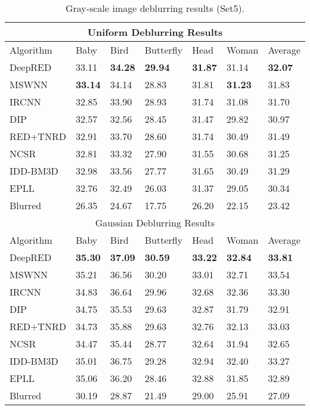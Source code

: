 \documentclass[12pt]{article}
\begin{document}
\begin{table}[!t]
 \centering
 \footnotesize\addtolength{\tabcolsep}{-5pt}
\begin{tabularx}{\linewidth}{|l||X X X X X||X|}
 \hline
 \multicolumn{7}{|c|}{Uniform Deblurring Results} \\
 \hline
 Algorithm & \textsf{Baby} & \textsf{Bird} & \textsf{Butterfly} & \textsf{Head} & \textsf{Woman} & Average \\ \hline
DeepRED & 33.11 & \textbf{34.28} & \textbf{29.94} & \textbf{31.87} & 31.14 & \textbf{32.07} \\
MSWNN & \textbf{33.14} & 34.14 & 28.83 & 31.81 &  \textbf{31.23} & 31.83 \\
IRCNN & 32.85 & 33.90 & 28.93 & 31.74 & 31.08 & 31.70 \\
DIP & 32.57 & 32.56 & 28.45 & 31.47 & 29.82 & 30.97 \\
RED+TNRD & 32.91 & 33.70 & 28.60 & 31.74 & 30.49 & 31.49 \\
NCSR & 32.81 & 33.32 & 27.90 & 31.55 & 30.68 & 31.25 \\
IDD-BM3D & 32.98 & 33.56 & 27.77 & 31.65 & 30.49 & 31.29 \\
EPLL & 32.76 & 32.49 & 26.03 & 31.37 & 29.05 & 30.34 \\ 
Blurred & 26.35 & 24.67 & 17.75 & 26.20 & 22.15 & 23.42 \\
 \hline
 \multicolumn{7}{|c|}{Gaussian Deblurring Results} \\
 \hline
 Algorithm & \textsf{Baby} & \textsf{Bird} & \textsf{Butterfly} & \textsf{Head} & \textsf{Woman} & Average \\ \hline
DeepRED & \textbf{35.30} & \textbf{37.09} & \textbf{30.59} & \textbf{33.22} & \textbf{32.84} & \textbf{33.81} \\
MSWNN & 35.21 & 36.56 & 30.20 & 33.01 &  32.71 & 33.54 \\
IRCNN & 34.83 & 36.64 & 29.96 & 32.68 & 32.36 & 33.30 \\
DIP & 34.75 & 35.53 & 29.63 & 32.87 & 31.79 & 32.91 \\
RED+TNRD & 34.73 & 35.88 & 29.63 & 32.76 & 32.13 & 33.03 \\
NCSR & 34.47 & 35.44 & 28.77 & 32.64 & 31.94 & 32.65 \\
IDD-BM3D & 35.01 & 36.75 & 29.28 & 32.94 & 32.40 & 33.27 \\
EPLL & 35.06 & 36.20 & 28.46 & 32.88 & 31.85 & 32.89 \\ 
Blurred & 30.19 & 28.87 & 21.49 & 29.00 & 25.91 & 27.09 \\
 \hline
\end{tabularx}
\caption{Gray-scale image deblurring results (\textsf{Set5}).}
\label{Tab:gray_blur}
\end{table}
\end{document}
